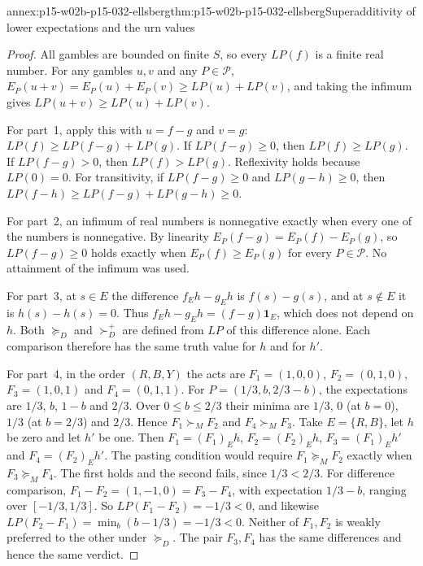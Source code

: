 \begin{annexitem}{annex:p15-w02b-p15-032-ellsberg}{thm:p15-w02b-p15-032-ellsberg}{Superadditivity of lower expectations and the urn values}
\begin{proof}
All gambles are bounded on finite \(S\), so every \(LP(f)\) is a finite real
number. For any gambles \(u,v\) and any \(P\in\mathcal P\),
\(E_P(u+v)=E_P(u)+E_P(v)\geq LP(u)+LP(v)\), and taking the infimum gives
\(LP(u+v)\geq LP(u)+LP(v)\).

For part~1, apply this with \(u=f-g\) and \(v=g\):
\(LP(f)\geq LP(f-g)+LP(g)\). If \(LP(f-g)\geq0\), then \(LP(f)\geq LP(g)\).
If \(LP(f-g)>0\), then \(LP(f)>LP(g)\). Reflexivity holds because
\(LP(0)=0\). For transitivity, if \(LP(f-g)\geq0\) and \(LP(g-h)\geq0\), then
\(LP(f-h)\geq LP(f-g)+LP(g-h)\geq0\).

For part~2, an infimum of real numbers is nonnegative exactly when every
one of the numbers is nonnegative. By linearity \(E_P(f-g)=E_P(f)-E_P(g)\),
so \(LP(f-g)\geq0\) holds exactly when \(E_P(f)\geq E_P(g)\) for every
\(P\in\mathcal P\). No attainment of the infimum was used.

For part~3, at \(s\in E\) the difference \(f_Eh-g_Eh\) is \(f(s)-g(s)\), and
at \(s\notin E\) it is \(h(s)-h(s)=0\). Thus \(f_Eh-g_Eh=(f-g)\mathbf 1_E\),
which does not depend on \(h\). Both \(\succeq_D\) and \(\succ_D^{+}\) are
defined from \(LP\) of this difference alone. Each comparison therefore
has the same truth value for \(h\) and for \(h'\).

For part~4, in the order \((R,B,Y)\) the acts are \(F_1=(1,0,0)\),
\(F_2=(0,1,0)\), \(F_3=(1,0,1)\) and \(F_4=(0,1,1)\). For
\(P=(1/3,b,2/3-b)\), the expectations are \(1/3\), \(b\), \(1-b\) and
\(2/3\). Over \(0\leq b\leq2/3\) their minima are \(1/3\), \(0\) (at \(b=0\)),
\(1/3\) (at \(b=2/3\)) and \(2/3\). Hence \(F_1\succ_MF_2\) and
\(F_4\succ_MF_3\). Take \(E=\{R,B\}\), let \(h\) be zero and let \(h'\) be one.
Then \(F_1=(F_1)_Eh\), \(F_2=(F_2)_Eh\), \(F_3=(F_1)_Eh'\) and
\(F_4=(F_2)_Eh'\). The pasting condition would require
\(F_1\succeq_MF_2\) exactly when \(F_3\succeq_MF_4\). The first holds and
the second fails, since \(1/3<2/3\). For difference comparison,
\(F_1-F_2=(1,-1,0)=F_3-F_4\), with expectation \(1/3-b\), ranging over
\([-1/3,1/3]\). So \(LP(F_1-F_2)=-1/3<0\), and likewise
\(LP(F_2-F_1)=\min_b(b-1/3)=-1/3<0\). Neither of \(F_1,F_2\) is weakly
preferred to the other under \(\succeq_D\). The pair \(F_3,F_4\) has the
same differences and hence the same verdict.


\end{proof}
\end{annexitem}
